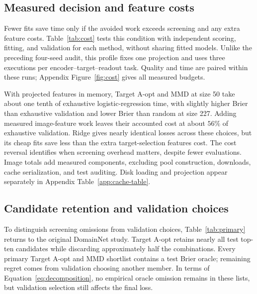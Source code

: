 \subsection{Measured decision and feature costs}
\label{sec:cost}
Fewer fits save time only if the avoided work exceeds screening and any extra feature costs. Table~\ref{tab:cost} tests this condition with independent scoring, fitting, and validation for each method, without sharing fitted models. Unlike the preceding four-seed audit, this profile fixes one projection and uses three executions per encoder--target--readout task. Quality and time are paired within these runs; Appendix Figure~\ref{fig:cost} gives all measured budgets.

With projected features in memory, Target A-opt and MMD at size 50 take about one tenth of exhaustive logistic-regression time, with slightly higher Brier than exhaustive validation and lower Brier than random at size 227. Adding measured image-feature work leaves their accounted cost at about $56\%$ of exhaustive validation. Ridge gives nearly identical losses across these choices, but its cheap fits save less than the extra target-selection features cost. The cost reversal identifies when screening overhead matters, despite fewer evaluations. Image totals add measured components, excluding pool construction, downloads, cache serialization, and test auditing. Disk loading and projection appear separately in Appendix Table~\ref{app:cache-table}.

\begin{table}[ht]
\centering
\caption{Matched final Brier and mean accounted time in seconds are reported for the two readouts. Resident time includes scoring, fitting, and validation from in-memory projected features. Images adds the separately measured feature work for the fixed pool inventory; it is an additive profile, not a complete pipeline replay. All means use the same timed choices.}
\label{tab:cost}

\end{table}

\subsection{Candidate retention and validation choices}
To distinguish screening omissions from validation choices, Table~\ref{tab:primary} returns to the original DomainNet study. Target A-opt retains nearly all test top-ten candidates while discarding approximately half the combinations. Every primary Target A-opt and MMD shortlist contains a test Brier oracle; remaining regret comes from validation choosing another member. In terms of Equation~\eqref{eq:decomposition}, no empirical oracle omission remains in these lists, but validation selection still affects the final loss.

